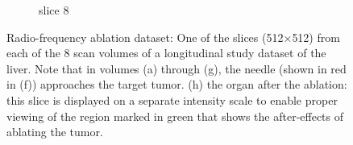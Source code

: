 \documentclass[journal]{IEEEtran}
\begin{document}
\begin{figure}[h!]
\begin{subfigure}[b]{0.24\linewidth}
 \caption{slice 8}
    \end{subfigure}     
     \caption{Radio-frequency ablation dataset: One of the slices (512$\times$512) from each of the 8 scan volumes of a longitudinal study dataset of the liver. Note that in volumes (a) through (g), the needle (shown in red in (f)) approaches the target tumor. (h) the organ after the ablation: this slice is displayed on a separate intensity scale to enable proper viewing of the region marked in green that shows the after-effects of ablating the tumor.} 
\label{fig:RFA2_test_object-prior}
\end{figure}

\begin{figure}[!h]
\centering
{}\hfill
{}\hfill
{}\hfill
{}

\end{figure}
\end{document}
